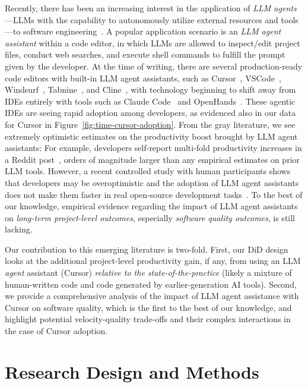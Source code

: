 Recently, there has been an increasing interest in the application of \emph{LLM agents}---LLMs with the capability to autonomously utilize external resources and tools---to software engineering~\cite{DBLP:journals/corr/abs-2408-02479, DBLP:journals/corr/abs-2404-04834, DBLP:journals/corr/abs-2409-02977}.
A popular application scenario is an \emph{LLM agent assistant} within a code editor, in which LLMs are allowed to inspect/edit project files, conduct web searches, and execute shell commands to fulfill the prompt given by the developer.
At the time of writing, there are several production-ready code editors with built-in LLM agent assistants, such as Cursor~\cite{cursor}, VSCode~\cite{vscode}, Windsurf~\cite{windsurf}, Tabnine~\cite{tabnine}, and Cline~\cite{cline}, with technology beginning to shift away from IDEs entirely with tools such as Claude Code~\cite{claude-code} and OpenHands~\cite{openhands}.
These agentic IDEs are seeing rapid adoption among developers, as evidenced also in our data for Cursor in Figure~\ref{fig:time-cursor-adoption}.
From the gray literature, we see extremely optimistic estimates on the productivity boost brought by LLM agent assistants: For example, developers self-report multi-fold productivity increases in a Reddit post~\cite{cursor-reddit-survey}, orders of magnitude larger than any empirical estimates on prior LLM tools.
However, a recent controlled study with human participants shows that developers may be overoptimistic and the adoption of LLM agent assistants does not make them faster in real open-source development tasks~\cite{DBLP:journals/corr/abs-2507-09089}.
To the best of our knowledge, empirical evidence regarding the impact of LLM agent assistants on \emph{long-term project-level outcomes}, especially \emph{software quality outcomes}, is still lacking.

Our contribution to this emerging literature is two-fold.
First, our DiD design looks at the additional project-level productivity gain, if any, from using an LLM \textit{agent} assistant (Cursor) \emph{relative to the state-of-the-practice} (likely a mixture of human-written code and code generated by earlier-generation AI tools).
Second, we provide a comprehensive analysis of the impact of LLM agent assistance with Cursor on software quality, which is the first to the best of our knowledge, and highlight potential velocity-quality trade-offs and their complex interactions in the case of Cursor adoption.

\section{Research Design and Methods}

